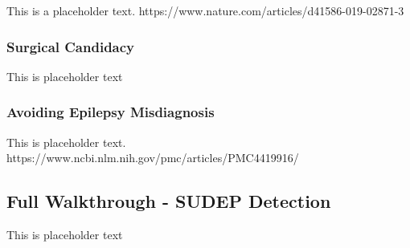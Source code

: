 This is a placeholder text. https://www.nature.com/articles/d41586-019-02871-3

\subsubsection{Surgical Candidacy}

This is placeholder text

\subsubsection{Avoiding Epilepsy Misdiagnosis}

This is placeholder text. https://www.ncbi.nlm.nih.gov/pmc/articles/PMC4419916/

\subsection{Full Walkthrough - SUDEP Detection}

This is placeholder text



